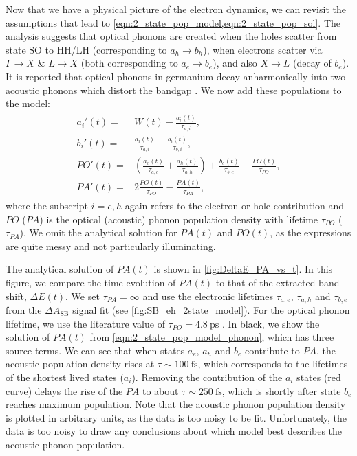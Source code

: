 Now that we have a physical picture of the electron dynamics, we can revisit the assumptions that lead to \cref{eqn:2_state_pop_model,eqn:2_state_pop_sol}. The analysis suggests that optical phonons are created when the holes scatter from state SO to HH/LH (corresponding to $a_h \rightarrow b_h$), when electrons scatter via $\Gamma \rightarrow X$ \& $L \rightarrow X$ (both corresponding to $a_e \rightarrow b_e$), and also $X \rightarrow L$ (decay of $b_e$). It is reported that optical phonons in germanium decay anharmonically into two acoustic phonons which distort the bandgap \cite{kaplanFemtosecondTrackingCarrier2018}. We now add these populations to the model:
\begin{align}
\label{eqn:2_state_pop_model_phonon}
\begin{split}
a_{i}'(t) ={}& W(t) - \frac{a_{i}(t)}{\tau_{a,i}}, \\
b_{i}'(t) ={}& \frac{a_{i}(t)}{\tau_{a,i}} - \frac{b_{i}(t)}{\tau_{b,i}}, \\
PO'(t) ={}& \left( \frac{a_e(t)}{\tau_{a,e}} + \frac{a_h(t)}{\tau_{a,h}} \right) + \frac{b_e(t)}{\tau_{b,e}} - \frac{PO(t)}{\tau_{PO}}, \\
PA'(t) ={}& 2 \frac{PO(t)}{\tau_{PO}} - \frac{PA(t)}{\tau_{PA}},
\end{split}
\end{align}
where the subscript $i=e,h$ again refers to the electron or hole contribution and $PO$ ($PA$) is the optical (acoustic) phonon population density with lifetime $\tau_{PO}$ ($\tau_{PA}$). We omit the analytical solution for $PA(t)$ and $PO(t)$, as the expressions are quite messy and not particularly illuminating.

The analytical solution of $PA(t)$ is shown in \cref{fig:DeltaE_PA_vs_t}. In this figure, we compare the time evolution of $PA(t)$ to that of the extracted band shift, $\Delta E(t)$. We set $\tau_{PA} = \infty$ and use the electronic lifetimes $\tau_{a,e}$, $\tau_{a,h}$ and $\tau_{b,e}$ from the $\Delta A_{\textrm{SB}}$ signal fit (see \cref{fig:SB_eh_2state_model}). For the optical phonon lifetime, we use the literature value of $\tau_{PO} = 4.8 \ \textrm{ps}$ \cite{kaplanFemtosecondTrackingCarrier2018}. In black, we show the solution of $PA(t)$ from \cref{eqn:2_state_pop_model_phonon}, which has three source terms. We can see that when states $a_e$, $a_h$ and $b_e$ contribute to $PA$, the acoustic population density rises at $\tau \sim 100 \ \textrm{fs}$, which corresponds to the lifetimes of the shortest lived states ($a_i$). Removing the contribution of the $a_i$ states (red curve) delays the rise of the $PA$ to about $\tau \sim 250 \ \textrm{fs}$, which is shortly after state $b_e$ reaches maximum population. Note that the acoustic phonon population density is plotted in arbitrary units, as the data is too noisy to be fit. Unfortunately, the data is too noisy to draw any conclusions about which model best describes the acoustic phonon population.

